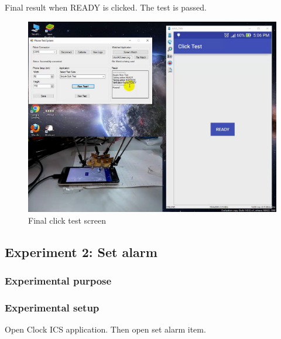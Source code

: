 Final result when READY is clicked. The test is passed.
	\begin{figure}[H]
		\centering
		\includegraphics[scale=0.5]{Chapters/Fig/click_final.png}
		\caption{Final click test screen}
		\label{fig:click_final}
	\end{figure}

\subsection{Experiment 2: Set alarm}
\subsubsection{Experimental purpose}

\subsubsection{Experimental setup}
Open Clock ICS application. Then open set alarm item.

